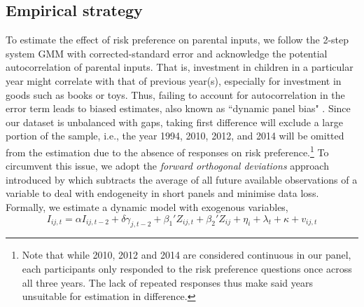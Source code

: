 \documentclass[emulatestandardclasses, 10pt, abstract = true]{scrartcl}
\begin{document}
\subsection{Empirical strategy}
To estimate the effect of risk preference on parental inputs, we follow the 2-step system GMM \citep{arellano1991some,blundell1998initial} with corrected-standard error \citep{windmeijer2005finite} and acknowledge the potential autocorrelation of parental inputs. That is, investment in children in a particular year might correlate with that of previous year(s), especially for investment in goods such as books or toys. Thus, failing to account for autocorrelation in the error term leads to biased estimates, also known as ``dynamic panel bias" \citep{nickell1981biases}. Since our dataset is unbalanced with gaps, taking first difference will exclude a large portion of the sample, i.e., the year 1994, 2010, 2012, and 2014 will be omitted from the estimation due to the absence of responses on risk preference.\footnote{Note that while 2010, 2012 and 2014 are considered continuous in our panel, each participants only responded to the risk preference questions once across all three years. The lack of repeated responses thus make said years unsuitable for estimation in difference.} To circumvent this issue, we adopt the \textit{forward orthogonal deviations} approach introduced by \citet{arellano1995another} which subtracts the average of all future available observations of a variable to deal with endogeneity in short panels and minimise data loss. Formally, we estimate a dynamic model with exogenous variables,
\begin{equation}
	I_{ij,t}=\alpha I_{ij,t-2} + \delta\gamma_{j,t-2}+ \beta_1' Z_{ij,t} + \beta_2' Z_{ij} + \eta_i + \lambda_t + \kappa + v_{ij,t}
	\label{eq:empirical-specification}
\end{equation}
\end{document}
